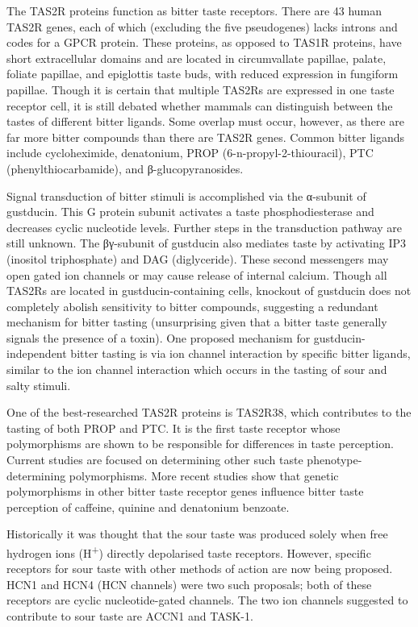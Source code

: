 The TAS2R proteins function as bitter taste receptors. There are 43
human TAS2R genes, each of which (excluding the five pseudogenes) lacks
introns and codes for a GPCR protein. These proteins, as opposed to
TAS1R proteins, have short extracellular domains and are located in
circumvallate papillae, palate, foliate papillae, and epiglottis taste
buds, with reduced expression in fungiform papillae. Though it is
certain that multiple TAS2Rs are expressed in one taste receptor cell,
it is still debated whether mammals can distinguish between the tastes
of different bitter ligands. Some overlap must occur, however, as there
are far more bitter compounds than there are TAS2R genes. Common bitter
ligands include cycloheximide, denatonium, PROP
(6-n-propyl-2-thiouracil), PTC (phenylthiocarbamide), and
β-glucopyranosides.

Signal transduction of bitter stimuli is accomplished via the α-subunit
of gustducin. This G protein subunit activates a taste phosphodiesterase
and decreases cyclic nucleotide levels. Further steps in the
transduction pathway are still unknown. The βγ-subunit of gustducin also
mediates taste by activating IP3 (inositol triphosphate) and DAG
(diglyceride). These second messengers may open gated ion channels or
may cause release of internal calcium. Though all TAS2Rs are located in
gustducin-containing cells, knockout of gustducin does not completely
abolish sensitivity to bitter compounds, suggesting a redundant
mechanism for bitter tasting (unsurprising given that a bitter taste
generally signals the presence of a toxin). One proposed mechanism for
gustducin-independent bitter tasting is via ion channel interaction by
specific bitter ligands, similar to the ion channel interaction which
occurs in the tasting of sour and salty stimuli.

One of the best-researched TAS2R proteins is TAS2R38, which contributes
to the tasting of both PROP and PTC. It is the first taste receptor
whose polymorphisms are shown to be responsible for differences in taste
perception. Current studies are focused on determining other such taste
phenotype-determining polymorphisms. More recent studies show that
genetic polymorphisms in other bitter taste receptor genes influence
bitter taste perception of caffeine, quinine and denatonium benzoate.

Historically it was thought that the sour taste was produced solely when
free hydrogen ions (H\textsuperscript{+}) directly depolarised taste
receptors. However, specific receptors for sour taste with other methods
of action are now being proposed. HCN1 and HCN4 (HCN channels) were two
such proposals; both of these receptors are cyclic nucleotide-gated
channels. The two ion channels suggested to contribute to sour taste are
ACCN1 and TASK-1.

